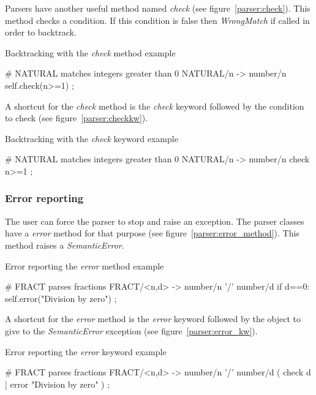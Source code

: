 Parsers have another useful method named \emph{check} (see figure~\ref{parser:check}).
This method checks a condition.
If this condition is false then \emph{WrongMatch} if called in order to backtrack.

\begin{code}
\caption{Backtracking with the \emph{check} method example}		\label{parser:check}
\begin{verbatimtab}[4]
	# NATURAL matches integers greater than 0
	NATURAL/n ->
		number/n
		{{ self.check(n>=1) }}
		;
\end{verbatimtab}
\end{code}

A shortcut for the \emph{check} method is the \emph{check} keyword followed by the condition to check (see figure~\ref{parser:checkkw}).

\begin{code}
\caption{Backtracking with the \emph{check} keyword example}	\label{parser:checkkw}
\begin{verbatimtab}[4]
	# NATURAL matches integers greater than 0
	NATURAL/n ->
		number/n
		check {{ n>=1 }}
		;
\end{verbatimtab}
\end{code}

\subsubsection{Error reporting}

The user can force the parser to stop and raise an exception.
The parser classes have a \emph{error} method for that purpose (see figure~\ref{parser:error_method}).
This method raises a \emph{SemanticError}.

\begin{code}
\caption{Error reporting the \emph{error} method example}	\label{parser:error_method}
\begin{verbatimtab}[4]
	# FRACT parses fractions
	FRACT/<n,d> ->
		number/n '/' number/d
		{{ if d==0: self.error("Division by zero") }}
		;
\end{verbatimtab}
\end{code}

A shortcut for the \emph{error} method is the \emph{error} keyword followed by the object to give to the \emph{SemanticError} exception (see figure~\ref{parser:error_kw}).

\begin{code}
\caption{Error reporting the \emph{error} keyword example}	\label{parser:error_kw}
\begin{verbatimtab}[4]
	# FRACT parses fractions
	FRACT/<n,d> ->
		number/n '/' number/d
		( check d | error "Division by zero" )
		;
\end{verbatimtab}
\end{code}

